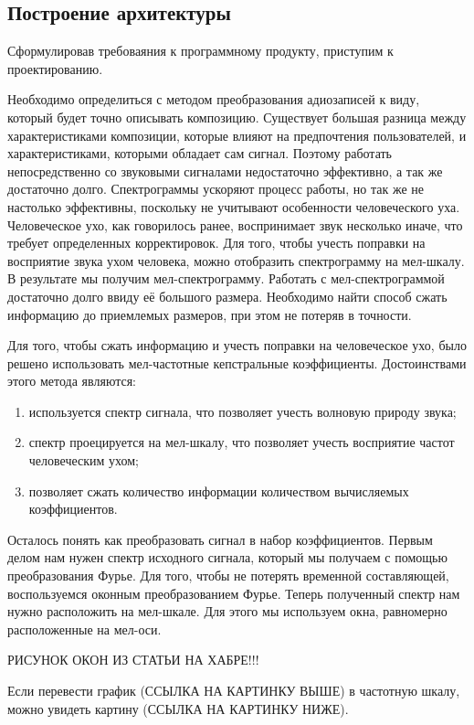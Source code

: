 \subsection{Построение архитектуры}
\label{sec:design:dev}

Сформулировав требоваяния к программному продукту, приступим к проектированию.

Необходимо определиться с методом преобразования адиозаписей к виду, который будет точно описывать композицию. Существует большая разница между характеристиками композиции, которые влияют на предпочтения пользователей, и характеристиками, которыми обладает сам сигнал. Поэтому работать непосредственно со звуковыми сигналами недостаточно эффективно, а так же достаточно долго. Спектрограммы ускоряют процесс работы, но так же не настолько эффективны, поскольку не учитывают особенности человеческого уха. Человеческое ухо, как говорилось ранее, воспринимает звук несколько иначе, что требует определенных корректировок. Для того, чтобы учесть поправки на восприятие звука ухом человека, можно отобразить спектрограмму на мел-шкалу. В результате мы получим мел-спектрограмму. Работать с мел-спектрограммой достаточно долго ввиду её большого размера. Необходимо найти способ сжать информацию до приемлемых размеров, при этом не потеряв в точности.

Для того, чтобы сжать информацию и учесть поправки на человеческое ухо, было решено использовать мел-частотные кепстральные коэффициенты. Достоинствами этого метода являются:
\begin{enumerate}
  \item используется спектр сигнала, что позволяет учесть волновую природу звука;
  \item спектр проецируется на мел-шкалу, что позволяет учесть восприятие частот человеческим ухом;
  \item позволяет сжать количество информации количеством вычисляемых коэффициентов.
\end{enumerate}

Осталось понять как преобразовать сигнал в набор коэффициентов. Первым делом нам нужен спектр исходного сигнала, который мы получаем с помощью преобразования Фурье. Для того, чтобы не потерять временной составляющей, воспользуемся оконным преобразованием Фурье. Теперь полученный спектр нам нужно расположить на мел-шкале. Для этого мы используем окна, равномерно расположенные на мел-оси.

РИСУНОК ОКОН ИЗ СТАТЬИ НА ХАБРЕ!!!

Если перевести график (ССЫЛКА НА КАРТИНКУ ВЫШЕ) в частотную шкалу, можно увидеть картину (ССЫЛКА НА КАРТИНКУ НИЖЕ).

